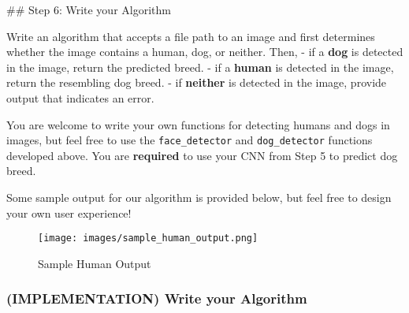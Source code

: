 \documentclass[11pt]{article}
\makeatletter
\def\maxwidth{\ifdim\Gin@nat@width>\linewidth\linewidth
    \else\Gin@nat@width\fi}
\let\Oldincludegraphics\includegraphics
\renewcommand{\includegraphics}[1]{\Oldincludegraphics[width=.8\maxwidth]{#1}}
\makeatother
\begin{document}
 \#\# Step 6: Write your Algorithm

Write an algorithm that accepts a file path to an image and first
determines whether the image contains a human, dog, or neither. Then, -
if a \textbf{dog} is detected in the image, return the predicted breed.
- if a \textbf{human} is detected in the image, return the resembling
dog breed. - if \textbf{neither} is detected in the image, provide
output that indicates an error.

You are welcome to write your own functions for detecting humans and
dogs in images, but feel free to use the \texttt{face\_detector} and
\texttt{dog\_detector} functions developed above. You are
\textbf{required} to use your CNN from Step 5 to predict dog breed.

Some sample output for our algorithm is provided below, but feel free to
design your own user experience!

\begin{figure}
\centering
\texttt{[image: images/sample\_human\_output.png]}
\caption{Sample Human Output}
\end{figure}

\subsubsection{(IMPLEMENTATION) Write your
Algorithm}\label{implementation-write-your-algorithm}
\end{document}
